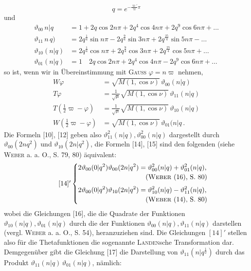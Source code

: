 \[q=e^{-\frac{\varpi'}\varpi\pi}\]
\noindent und
\[\begin{aligned}
\vartheta_{00}\,n|q&=1+2q\cos2n\pi+2q^4\cos4n\pi+2q^9\cos6n\pi+\ldots\\[4pt]
\vartheta_{11}\,n\,q)&=2q^{\frac14}\sin n\pi-2q^{\frac94}\sin3n\pi+2q^{\frac{25}4}\sin5n\pi-\ldots\\[4pt]
\vartheta_{10}(n|q)&=2q^{\frac14}\cos n\pi+2q^{\frac94}\cos3n\pi+2q^{\frac{25}4}\cos5n\pi+\ldots\\[4pt]
\vartheta_{01}(n|q)&=1\quad2q\cos2n\pi+2q^4\cos4n\pi-2q^9\cos6n\pi+\ldots
\end{aligned}\]
\noindent so ist, wenn wir in Übereinstimmung mit \textsc{Gauss} $\varphi=n\varpi$ nehmen,
\[\begin{aligned}
W\varphi&=\sqrt{M(1,\cos\nu)}\,\vartheta_{00}(n|q)\\[4pt]
T\varphi&=\frac1{\sqrt\mu}\sqrt{M(1,\cos\nu)}\,\vartheta_{11}(n|q)\\[4pt]
T(\tfrac12\varpi-\varphi)&=\frac1{\sqrt\mu}\sqrt{M(1,\cos\nu)}\,\vartheta_{10}(n|q)\\[4pt]
W(\tfrac12\varpi-\varphi)&=\sqrt{M(1,\cos\nu)}\,\vartheta_{01}(n|q\,.
\end{aligned}\]
\noindent Die Formeln [10], [12] geben also $\vartheta_{11}^2(n|q),\vartheta_{00}^2(n|q)$ dargestellt durch $\vartheta_{00}(2nq^2)$ und $\vartheta_{10}(2n|q^2)$, die Formeln [14], [15] sind den folgenden (siehe \textsc{Weber} a. a. O., S. 79, 80) äquivalent:
\begin{equation*}\tag*{$[14]'$}\left\{\begin{aligned}
2\vartheta_{00}(0|q^2)\vartheta_{00}(2n|q^2)&=\vartheta_{00}^2(n|q)+\vartheta_{01}^2(n|q),\\[-1pt]
&\hspace{1em}\text{(\textsc{Weber} (16), S. 80)}\\[3pt]
2\vartheta_{00}(0|q^2)\vartheta_{10}(2n|q^2)&=\vartheta_{10}^2(n|q)-\vartheta_{11}^2(n|q),\\[-1pt]
&\hspace{1em}\text{(\textsc{Weber} (14), S. 80)}
\end{aligned}\right.\end{equation*}
\noindent wobei die Gleichungen [16], die die Quadrate der Funktionen $\vartheta_{10}(n|q),\vartheta_{01}(n|q)$ durch die der Funktionen $\vartheta_{00}(n|q),\vartheta_{11}(n|q)$ darstellen (vergl. \textsc{Weber} a. a. O., S. 54), heranzuziehen sind. Die Gleichungen $[14]'$ stellen also für die Thetafunktionen die sogenannte \textsc{Landen}sche Transformation dar. Demgegenüber gibt die Gleichung [17] die Darstellung von $\vartheta_{11}(n|q^{\frac12})$ durch das Produkt $\vartheta_{11}(n|q)\,\vartheta_{01}(n|q)$, nämlich:
